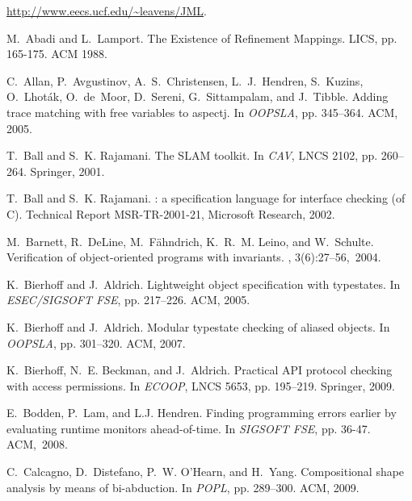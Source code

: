 \documentclass{sigplanconf}[10pt] %
\begin{document}
\begin{thebibliography}{10}


\url{http://www.eecs.ucf.edu/~leavens/JML}.

M.~Abadi and L.~Lamport.
\newblock The Existence of Refinement Mappings.
\newblock LICS, pp. 165-175. ACM 1988.

C.~Allan, P.~Avgustinov, A.~S.~Christensen, L.~J.~Hendren,
  S.~Kuzins, O.~Lhot{\'a}k, O.~de~Moor, D.~Sereni, G.~Sittampalam, and J.~Tibble.
\newblock Adding trace matching with free variables to aspectj.
\newblock In {\em OOPSLA}, pp. 345--364. ACM, 2005.

T.~Ball and S.~K. Rajamani.
\newblock The {SLAM} toolkit.
\newblock In  {\em CAV}, LNCS 2102, pp. 260--264. Springer, 2001.

T.~Ball and S.~K. Rajamani.
: a specification language for interface checking (of {C}).
\newblock Technical Report MSR-TR-2001-21, Microsoft Research, 2002.

M.~Barnett, R.~DeLine, M.~F{\"a}hndrich, K.~R.~M. Leino, and
  W.~Schulte.
\newblock Verification of object-oriented programs with invariants.
, 3(6):27--56,~2004.

K.~Bierhoff and J.~Aldrich.
\newblock Lightweight object specification with typestates.
\newblock In {\em ESEC/SIGSOFT FSE}, pp. 217--226. ACM, 2005.

K.~Bierhoff and J.~Aldrich.
\newblock Modular typestate checking of aliased objects.
\newblock In  {\em OOPSLA}, pp. 301--320. ACM, 2007.

K.~Bierhoff, N.~E. Beckman, and J.~Aldrich.
\newblock Practical {API} protocol checking with access permissions.
\newblock In {\em ECOOP}, LNCS 5653, pp. 195--219. Springer, 2009.

E.~Bodden, P.~Lam, and L.J. Hendren.
\newblock Finding programming errors earlier by evaluating runtime monitors
  ahead-of-time.
\newblock In  {\em SIGSOFT FSE}, pp. 36-47. ACM,~2008.

C.~Calcagno, D.~Distefano, P.~W. O'Hearn, and H.~Yang.
\newblock Compositional shape analysis by means of bi-abduction.
\newblock In {\em POPL}, pp. 289--300. ACM, 2009.


\end{thebibliography}
\end{document}
